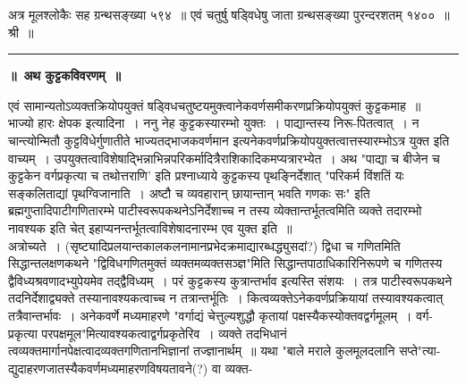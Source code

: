 \documentclass[11pt, openany]{book}
\begin{document}
 अत्र मूलश्लोकैः सह ग्रन्थसङ्ख्या ५९४~॥ एवं चतुर्षु षड्विधेषु 
जाता ग्रन्थसङ्ख्या पुरन्दरशतम् १४००~॥ श्री~॥

 \begin{center}
     \rule{0.2\linewidth}{0.5pt}
 \end{center}
\newpage%

 \label{kuttaka}
\begin{center}
    \textbf{\LARGE ॥~अथ कुट्टकविवरणम्~॥ }
\end{center}

\vspace{2mm}
 एवं सामान्यतोऽव्यक्तक्रियोपयुक्तं
षड्विधचतुष्टयमुक्त्वानेकवर्णसमीकरणप्रक्रियोपयुक्तं कुट्टकमाह~॥ \\

\vspace{-3mm}
 भाज्यो हारः क्षेपक इत्यादिना~। ननु नेह कुट्टकस्यारम्भो युक्तः~। 
पाद्यान्तस्य निरू-पितत्वात्~। न चान्त्योन्मितौ कुट्टविधेर्गुणातीते
भाज्यतद्भाजकवर्णमान इत्यनेकवर्णप्रक्रियोपयुक्तत्वात्तस्यारम्भोऽत्र युक्त इति वाच्यम्~। उपयुक्तत्वाविशेषाद्भिन्नाभिन्नपरिकर्मादित्रैराशिकादिकमप्यत्रारभ्येत~। अथ
{\qt "पाद्या च बीजेन च कुट्टकेन वर्गप्रकृत्या च तथोत्तराणि'} इति {\qt प्रश्नाध्याये} कुट्टकस्य पृथङ्निर्देशात् {\qt "परिकर्म विंशतिं यः सङ्कलिताद्यां पृथग्विजानाति~। अष्टौ च व्यवहारान् छायान्तान् भवति गणकः सः"} इति {\qt ब्रह्मगुप्तादिपाटीगणितारम्भे} पाटीस्वरूपकथनेऽनिर्देशाच्च न तस्य व्येक्तान्तर्भूतत्वमिति व्यक्ते तदारम्भो नावश्यक इति चेत् इहाप्यनन्तर्भूतत्वाविशेषादनारम्भ एव युक्त इति~॥ \\

\vspace{-3mm}
 अत्रोच्यते~। (सृष्ट्यादिप्रलयान्तकालकलनामानप्रभेदक्रमाद्यारब्धद्ध्युसदां?) द्विधा च गणितमिति सिद्धान्तलक्षणकथने {\qt "द्विविधगणितमुक्तं
व्यक्तमव्यक्तसञ्ज्ञ"}मिति सिद्धान्तपाठाधिकारिनिरूपणे च गणितस्य
द्वैविध्यश्रवणादभ्युपेयमेव तद्द्वैविध्यम्~। परं कुट्टकस्य कुत्रान्तर्भाव इत्यस्ति संशयः~। तत्र पाटीस्वरूपकथने तदनिर्देशाद्व्यक्ते तस्यानावश्यकत्वाच्च न तत्रान्तर्भूतिः~।
कित्वव्यक्तेऽनेकवर्णप्रक्रियायां तस्यावश्यकत्वात् तत्रैवान्तर्भावः~।
अनेकवर्णे मध्यमाहरणे {\qt "वर्गाद्यं चेत्तुल्यशुद्धौ कृतायां
पक्षस्यैकस्योक्तवद्वर्गमूलम्~। वर्ग-प्रकृत्या परपक्षमूल"}मित्यावश्यकत्वाद्वर्गप्रकृतेरिव~। व्यक्ते तदभिधानं त्वव्यक्तमार्गानपेक्षत्वादव्यक्तगणितानभिज्ञानां तज्ज्ञानार्थम्~॥ यथा {\qt "बाले मराले कुलमूलदलानि सप्ते"}त्या-द्युदाहरणजातस्यैकवर्णमध्यमाहरणविषयतावने(?) वा व्यक्त-
\afterpage{\fancyhead[RO,LE]{\textbf{\thepage}}}
\cfoot{}
\thispagestyle{empty}
\newpage%
\end{document}
